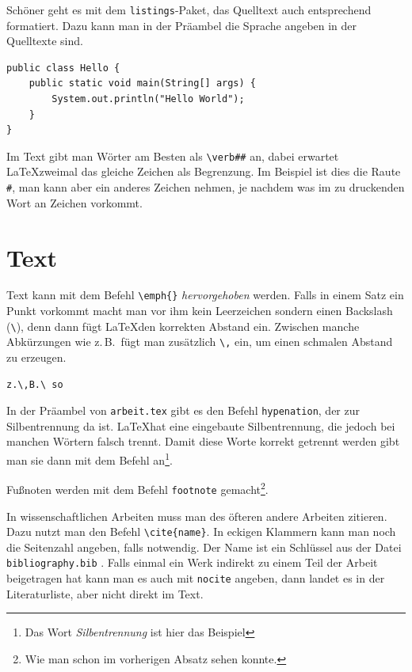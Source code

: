 Schöner geht es mit dem \verb|listings|-Paket, das Quelltext auch entsprechend formatiert. Dazu kann man in der Präambel die Sprache angeben in der Quelltexte sind.

\begin{lstlisting}
public class Hello {
    public static void main(String[] args) {
        System.out.println("Hello World");
    }
}
\end{lstlisting}

Im Text gibt man Wörter am Besten als \verb|\verb##| an, dabei erwartet \LaTeX zweimal das gleiche Zeichen als Begrenzung. Im Beispiel ist dies die Raute \verb|#|, man kann aber ein anderes Zeichen nehmen, je nachdem was im zu druckenden Wort an Zeichen vorkommt.



\section{Text}

Text kann mit dem Befehl \verb|\emph{}| \emph{hervorgehoben} werden. Falls in einem Satz ein Punkt vorkommt macht man vor ihm kein Leerzeichen sondern einen Backslash (\verb|\|), denn dann fügt \LaTeX den korrekten Abstand ein. Zwischen manche Abkürzungen wie z.\,B.\ fügt man zusätzlich \verb|\,| ein, um einen schmalen Abstand zu erzeugen.

\begin{verbatim}
z.\,B.\ so
\end{verbatim}

In der Präambel von \verb|arbeit.tex| gibt es den Befehl \verb|hypenation|, der zur Silbentrennung da ist. \LaTeX hat eine eingebaute Silbentrennung, die jedoch bei manchen Wörtern falsch trennt. Damit diese Worte korrekt getrennt werden gibt man sie dann mit dem Befehl an\footnote{Das Wort \emph{Silbentrennung} ist hier das Beispiel}.

Fußnoten werden mit dem Befehl \verb|footnote| gemacht\footnote{Wie man schon im vorherigen Absatz sehen konnte.}.

In wissenschaftlichen Arbeiten muss man des öfteren andere Arbeiten zitieren. Dazu nutzt man den Befehl \verb|\cite{name}|. In eckigen Klammern kann man noch die Seitenzahl angeben, falls notwendig. Der Name ist ein Schlüssel aus der Datei \verb|bibliography.bib| \cite[S.\ 10]{kopka}. Falls einmal ein Werk indirekt zu einem Teil der Arbeit beigetragen hat kann man es auch mit \verb|nocite| angeben, dann landet es in der Literaturliste, aber nicht direkt im Text.


